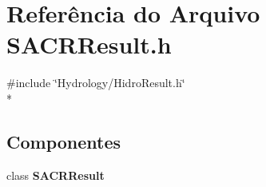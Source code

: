 \section{Referência do Arquivo S\+A\+C\+R\+Result.\+h}
\label{_s_a_c_r_result_8h}
{\ttfamily \#include \char`\"{}Hydrology/\+Hidro\+Result.\+h\char`\"{}}\\*
\subsection*{Componentes}
\begin{DoxyCompactItemize}
\item 
class {\bf S\+A\+C\+R\+Result}
\end{DoxyCompactItemize}
